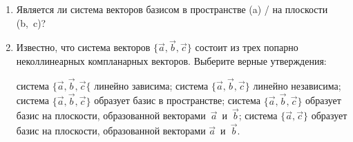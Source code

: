 \begin{enumerate}
    \item Является ли система векторов базисом в пространстве (a) / на плоскости (b,~c)?
    \begin{center}
    \end{center}
    \newpage
    \item Известно, что система векторов $\{\vec a, \vec b, \vec c\}$ состоит из трех попарно неколлинеарных компланарных векторов. Выберите верные утверждения:
    \begin{tasks}
        \task система $\{\vec a, \vec b, \vec c\{$ линейно зависима;
        \task система $\{\vec a, \vec b, \vec c\}$ линейно независима;
        \task система $\{\vec a, \vec b, \vec c\}$ образует базис в пространстве;
        \task система $\{\vec a, \vec b, \vec c\}$ образует базис на плоскости, образованной векторами~$\vec a$~и~$\vec b$;
        \task система $\{\vec a, \vec c\}$ образует базис на плоскости, образованной векторами $\vec a$~и~$\vec b$.
    \end{tasks}
    

\end{enumerate}
